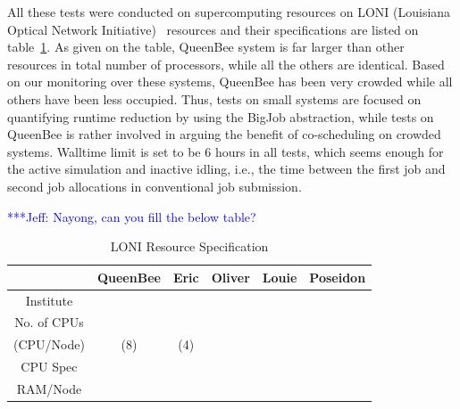 \documentclass[conference,final]{IEEEtran}
\newcommand{\skonote}[1]{ {\textcolor{blue} { ***Jeff: #1 }}}
\newcommand{\skonote}[1]{}
\begin{document}
All these tests were conducted on supercomputing resources on LONI (Louisiana Optical Network Initiative)~\cite{LONI_web} resources and their specifications are listed on table~\ref{table:LONI_resource}. As given on the table, QueenBee system is far larger than other resources in total number of processors, while all the others are identical. Based on our monitoring over these systems, QueenBee has been very crowded while all others have been less occupied. Thus, tests on small systems are focused on quantifying runtime reduction by using the BigJob abstraction, while tests on QueenBee is rather involved in arguing the benefit of co-scheduling on crowded systems. Walltime limit is set to be 6 hours in all tests, which seems enough for the active simulation and inactive idling, i.e., the time between the first job and second job allocations in conventional job submission.


\skonote{Nayong, can you fill the below table?}


\setlength{\tabcolsep}{1pt}
\begin{table}[!ht]
\begin{center}

\caption{\small LONI Resource Specification}
\label{table:LONI_resource}

\begin{tabular}{ c || c | c | c | c | c}

\hline
 & QueenBee & Eric & Oliver & Louie & Poseidon \\
\hline
\hline
Institute &  &  &  &  & \\
\hline
No. of CPUs &  &  \\
(CPU/Node) & (8) & (4) \\
\hline
CPU Spec &  &  \\
\hline
RAM/Node &  &  \\
\hline

\end{tabular}

\end{center}
\end{table}
\end{document}
